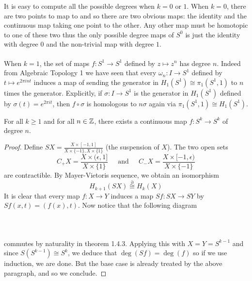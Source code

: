 \documentclass[a4paper]{article}
\begin{document}
It is easy to compute all the possible degrees when $k=0$ or $1$. When $k=0$, there are two points to map to and so there are two obvious maps: the identity and the continuous map taking one point to the other. Any other map must be homotopic to one of these two thus the only possible degree maps of $S^0$ is just the identity with degree $0$ and the non-trivial map with degree $1$. \\~\\

When $k=1$, the set of maps $f:S^1\to S^1$ defined by $z\mapsto z^n$ has degree $n$. Indeed from Algebraic Topology 1 we have seen that every $\omega_n:I\to S^1$ defined by $t\mapsto e^{2\pi int}$ induces a map of sending the generator in $H_1(S^1)\cong\pi_1(S^1,1)$ to $n$ times the generator. Explicitly, if $\sigma:I\to S^1$ is the generator in $H_1(S^1)$ defined by $\sigma(t)=e^{2\pi it}$, then $f\circ\sigma$ is homologous to $n\sigma$ again via $\pi_1(S^1,1)\cong H_1(S^1)$. 

\begin{prp}{}{} For all $k\geq 1$ and for all $n\in\mathbb{Z}$, there exists a continuous map $f:S^k\to S^k$ of degree $n$. \tcbline
\begin{proof}
Define $SX=\frac{X\times[-1,1]}{X\times\{-1\},X\times\{1\}}$ (the suspension of $X$). The two open sets $$C_+X=\frac{X\times(\epsilon,1]}{X\times\{1\}}\;\;\;\;\text{ and }\;\;\;\; C_-X=\frac{X\times[-1,\epsilon)}{X\times\{-1\}}$$ are contractible. By Mayer-Vietoris sequence, we obtain an isomorphism $$H_{k+1}(SX)\overset{\partial}{\cong}H_k(X)$$ It is clear that every map $f:X\to Y$ induces a map $Sf:SX\to SY$ by $Sf(x,t)=(f(x),t)$. Now notice that the following diagram \\~\\
\\~\\
commutes by naturality in theorem 1.4.3. Applying this with $X=Y=S^{k-1}$ and since $S(S^{k-1})\cong S^k$, we deduce that $\deg(Sf)=\deg(f)$ so if we use induction, we are done. But the base case is already treated by the above paragraph, and so we conclude. 
\end{proof}
\end{prp}
\end{document}
